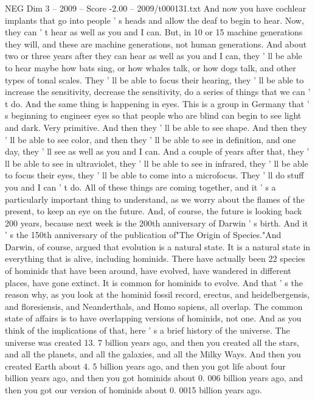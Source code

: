 \begin{textsample}{NEG Dim 3 – 2009 – Score -2.00 – 2009/t000131.txt}
And now you have cochlear implants that go into people ' s heads and allow the deaf to begin to hear.
Now, they can ' t hear as well as you and I can.
But, in 10 or 15 machine generations they will, and these are machine generations, not human generations.
And about two or three years after they can hear as well as you and I can, they ' ll be able to hear maybe how bats sing, or how whales talk, or how dogs talk, and other types of tonal scales.
They ' ll be able to focus their hearing, they ' ll be able to increase the sensitivity, decrease the sensitivity, do a series of things that we can ' t do.
And the same thing is happening in eyes.
This is a group in Germany that ' s beginning to engineer eyes so that people who are blind can begin to see light and dark.
Very primitive.
And then they ' ll be able to see shape.
And then they ' ll be able to see color, and then they ' ll be able to see in definition, and one day, they ' ll see as well as you and I can.
And a couple of years after that, they ' ll be able to see in ultraviolet, they ' ll be able to see in infrared, they ' ll be able to focus their eyes, they ' ll be able to come into a microfocus.
They ' ll do stuff you and I can ' t do.
All of these things are coming together, and it ' s a particularly important thing to understand, as we worry about the flames of the present, to keep an eye on the future.
And, of course, the future is looking back 200 years, because next week is the 200th anniversary of Darwin ' s birth.
And it ' s the 150th anniversary of the publication of"The Origin of Species."And Darwin, of course, argued that evolution is a natural state.
It is a natural state in everything that is alive, including hominids.
There have actually been 22 species of hominids that have been around, have evolved, have wandered in different places, have gone extinct.
It is common for hominids to evolve.
And that ' s the reason why, as you look at the hominid fossil record, erectus, and heidelbergensis, and floresiensis, and Neanderthals, and Homo sapiens, all overlap.
The common state of affairs is to have overlapping versions of hominids, not one.
And as you think of the implications of that, here ' s a brief history of the universe.
The universe was created 13. 7 billion years ago, and then you created all the stars, and all the planets, and all the galaxies, and all the Milky Ways.
And then you created Earth about 4. 5 billion years ago, and then you got life about four billion years ago, and then you got hominids about 0. 006 billion years ago, and then you got our version of hominids about 0. 0015 billion years ago.

\end{textsample}
